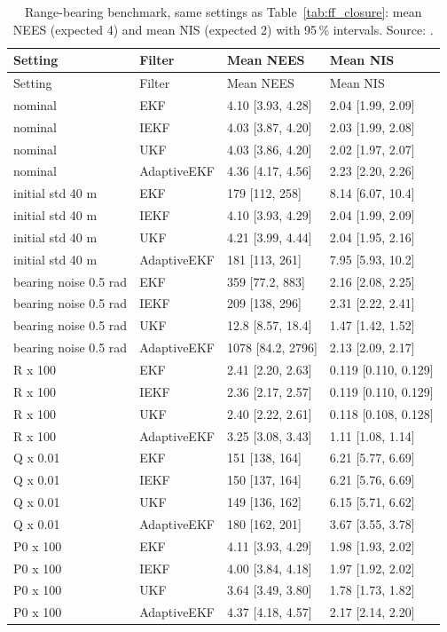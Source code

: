 {\scriptsize
\begin{longtable}{llll}
\caption{Range-bearing benchmark, same settings as Table~\ref{tab:ff_closure}: mean NEES (expected 4) and mean NIS (expected 2) with 95\,\% intervals. Source: .}\label{tab:ff_closure_cons}\\
\toprule
Setting & Filter & Mean NEES & Mean NIS \\
\midrule
\endfirsthead
\toprule
Setting & Filter & Mean NEES & Mean NIS \\
\midrule
\endhead
nominal & EKF & 4.10 [3.93, 4.28] & 2.04 [1.99, 2.09] \\
nominal & IEKF & 4.03 [3.87, 4.20] & 2.03 [1.99, 2.08] \\
nominal & UKF & 4.03 [3.86, 4.20] & 2.02 [1.97, 2.07] \\
nominal & AdaptiveEKF & 4.36 [4.17, 4.56] & 2.23 [2.20, 2.26] \\
initial std 40 m & EKF & 179 [112, 258] & 8.14 [6.07, 10.4] \\
initial std 40 m & IEKF & 4.10 [3.93, 4.29] & 2.04 [1.99, 2.09] \\
initial std 40 m & UKF & 4.21 [3.99, 4.44] & 2.04 [1.95, 2.16] \\
initial std 40 m & AdaptiveEKF & 181 [113, 261] & 7.95 [5.93, 10.2] \\
bearing noise 0.5 rad & EKF & 359 [77.2, 883] & 2.16 [2.08, 2.25] \\
bearing noise 0.5 rad & IEKF & 209 [138, 296] & 2.31 [2.22, 2.41] \\
bearing noise 0.5 rad & UKF & 12.8 [8.57, 18.4] & 1.47 [1.42, 1.52] \\
bearing noise 0.5 rad & AdaptiveEKF & 1078 [84.2, 2796] & 2.13 [2.09, 2.17] \\
R x 100 & EKF & 2.41 [2.20, 2.63] & 0.119 [0.110, 0.129] \\
R x 100 & IEKF & 2.36 [2.17, 2.57] & 0.119 [0.110, 0.129] \\
R x 100 & UKF & 2.40 [2.22, 2.61] & 0.118 [0.108, 0.128] \\
R x 100 & AdaptiveEKF & 3.25 [3.08, 3.43] & 1.11 [1.08, 1.14] \\
Q x 0.01 & EKF & 151 [138, 164] & 6.21 [5.77, 6.69] \\
Q x 0.01 & IEKF & 150 [137, 164] & 6.21 [5.76, 6.69] \\
Q x 0.01 & UKF & 149 [136, 162] & 6.15 [5.71, 6.62] \\
Q x 0.01 & AdaptiveEKF & 180 [162, 201] & 3.67 [3.55, 3.78] \\
P0 x 100 & EKF & 4.11 [3.93, 4.29] & 1.98 [1.93, 2.02] \\
P0 x 100 & IEKF & 4.00 [3.84, 4.18] & 1.97 [1.92, 2.02] \\
P0 x 100 & UKF & 3.64 [3.49, 3.80] & 1.78 [1.73, 1.82] \\
P0 x 100 & AdaptiveEKF & 4.37 [4.18, 4.57] & 2.17 [2.14, 2.20] \\
\bottomrule
\end{longtable}
}
